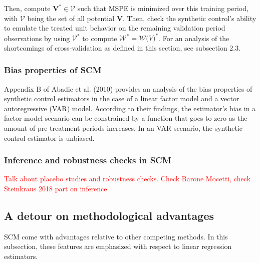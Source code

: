 \documentclass[12pt,a4paper,draft]{article}
\begin{document}
Then, compute $\mathbf{V}^* \in \mathcal{V}$ such that MSPE is minimized over this 
training period, with 
$\mathcal{V}$ being the set of all potential $\mathbf{V}$. Then, check the synthetic 
control's ability to emulate the treated unit behavior on the remaining validation 
period observations by using $\mathcal{V}^*$ to compute $\mathcal{W}^*=\mathcal{W} 
\mathcal(V)^*$.
\newline For an analysis of the shortcomings of cross-validation as defined in this 
section, see subsection 2.3.



\subsubsection{Bias properties of SCM}

Appendix B of Abadie et al. (2010) provides an analysis of the bias properties of synthetic 
control estimators in the case of a linear factor model and a vector autoregressive 
(VAR) model. According to their findings, the estimator's bias in a factor model 
scenario can be constrained by a function that goes to zero as the amount of 
pre-treatment periods increases. In an VAR scenario, the synthetic control 
estimator is unbiased.





\subsubsection{Inference and robustness checks in SCM}
\textcolor{red}{Talk about placebo studies and robustness checks. Check Barone Mocetti, check Steinkraus 2018 part on inference} %

















\subsection{A detour on methodological advantages}

SCM come with advantages relative to other competing methods. In this subsection, 
these features are emphasized with respect to linear regression estimators. 
\end{document}

